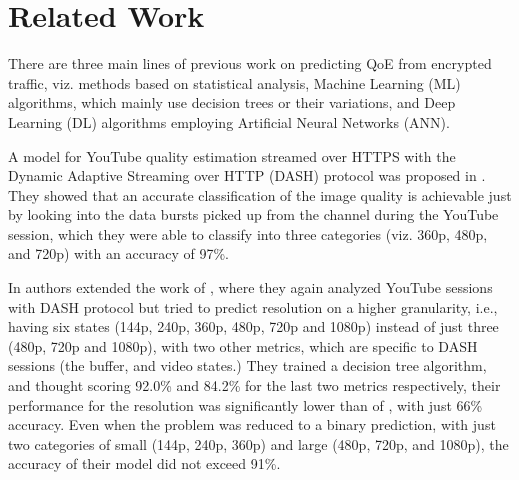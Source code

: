 \section{Related Work}

There are three main lines of previous work on predicting QoE from encrypted traffic, viz. methods based on statistical analysis, Machine Learning (ML) algorithms, which mainly use decision trees or their variations, and Deep Learning (DL) algorithms employing Artificial Neural Networks (ANN). 


A model for YouTube quality estimation streamed over HTTPS with the Dynamic Adaptive Streaming over HTTP (DASH) protocol was proposed in \cite{dubin2016video}. They showed that an accurate classification of the image quality is achievable just by looking into the data bursts picked up from the channel during the YouTube session, which they were able to classify into three categories (viz. 360p, 480p, and 720p) with an accuracy of 97\%. 


In \cite{gutterman2020requet} authors extended the work of \cite{dubin2016video}, where they again analyzed YouTube sessions with DASH protocol but tried to predict resolution on a higher granularity, i.e., having six states (144p, 240p, 360p, 480p, 720p and 1080p) instead of just three (480p, 720p and 1080p), with two other metrics, which are specific to DASH sessions (the buffer, and video states.) They trained a decision tree algorithm, and thought scoring 92.0\% and 84.2\% for the last two metrics respectively, their performance for the resolution was significantly lower than of \cite{dubin2016video}, with just 66\% accuracy. Even when the problem was reduced to a binary prediction, with just two categories of small (144p, 240p, 360p) and large (480p, 720p, and 1080p), the accuracy of their model did not exceed 91\%.

